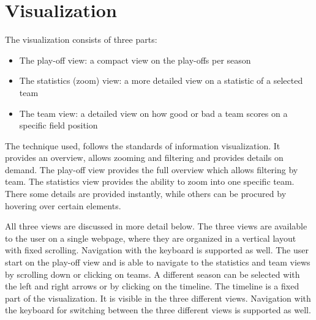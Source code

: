 \documentclass[]{sigchi}
\begin{document}



\section{Visualization}\label{sec:visualization}
The visualization consists of three parts:
\begin{itemize}
    \item The play-off view: a compact view on the play-offs per season
    \item The statistics (zoom) view: a more detailed view on a statistic of a
        selected team
    \item The team view: a detailed view on how good or bad a team scores on a
        specific field position
\end{itemize}

The technique used, follows the standards of information visualization. It provides
an overview, allows zooming and filtering and provides details on
demand\cite{mantra,multipleviews,automatingdesign}. The play-off view provides
the full overview which allows filtering by team. The statistics view provides
the ability to zoom into one specific team. There some details are provided
instantly, while others can be procured by hovering over certain elements.

All three views are discussed in more detail below. The three views are
available to the user on a single webpage, where they are organized in a 
vertical layout with fixed scrolling. Navigation with the keyboard is 
supported as well. The user start on the play-off view and is able to 
navigate to the statistics and team views by scrolling down or clicking 
on teams. A different season can be selected with the left and right
arrows or by clicking on the timeline. The timeline is a fixed part of the
visualization. It is visible in the three different views. Navigation 
with the keyboard for switching between the three different views is 
supported as well.
\end{document}
